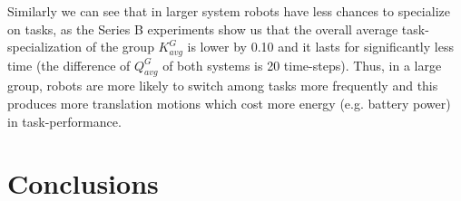 \documentclass[preprint,12pt]{elsarticle}
\begin{document}
Similarly we can see that in larger system robots have less chances to specialize on tasks, as the Series B experiments show us that the overall average task-specialization of the group $K^G_{avg}$ is lower by 0.10 and it lasts for significantly less time (the difference of $Q^G_{avg}$  of both systems is 20 time-steps). Thus, in a large group, robots are more likely to switch among tasks more frequently and this produces more translation motions which cost more energy (e.g. battery power) in task-performance.
\section{Conclusions}
\label{sec:conc}



\end{document}
